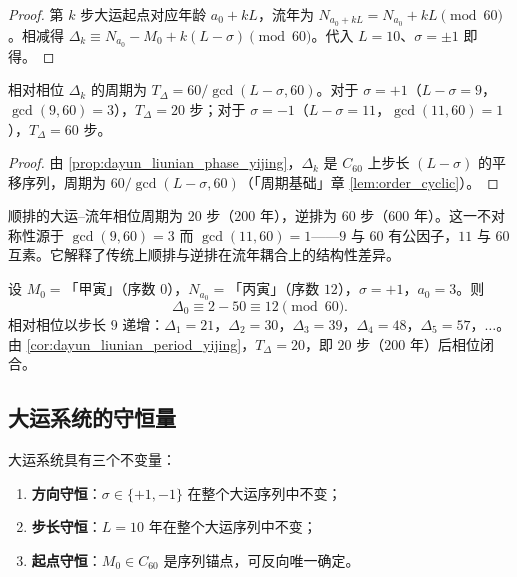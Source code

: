 \begin{proof}
第 $k$ 步大运起点对应年龄 $a_0+kL$，流年为 $N_{a_0+kL}=N_{a_0}+kL\pmod{60}$。相减得 $\Delta_k\equiv N_{a_0}-M_0+k(L-\sigma)\pmod{60}$。代入 $L=10$、$\sigma=\pm 1$ 即得。
\end{proof}

\begin{corollary}[大运--流年相对相位的周期]\label{cor:dayun_liunian_period_yijing}
相对相位 $\Delta_k$ 的周期为 $T_\Delta=60/\gcd(L-\sigma,60)$。对于 $\sigma=+1$（$L-\sigma=9$，$\gcd(9,60)=3$），$T_\Delta=20$ 步；对于 $\sigma=-1$（$L-\sigma=11$，$\gcd(11,60)=1$），$T_\Delta=60$ 步。
\end{corollary}

\begin{proof}
由 \cref{prop:dayun_liunian_phase_yijing}，$\Delta_k$ 是 $C_{60}$ 上步长 $(L-\sigma)$ 的平移序列，周期为 $60/\gcd(L-\sigma,60)$（「周期基础」章 \cref{lem:order_cyclic}）。
\end{proof}

\begin{remark}[顺排与逆排相位周期的不对称性]\label{rem:dayun_asymmetry_yijing}
顺排的大运--流年相位周期为 $20$ 步（$200$ 年），逆排为 $60$ 步（$600$ 年）。这一不对称性源于 $\gcd(9,60)=3$ 而 $\gcd(11,60)=1$——$9$ 与 $60$ 有公因子，$11$ 与 $60$ 互素。它解释了传统上顺排与逆排在流年耦合上的结构性差异。
\end{remark}

\begin{example}[大运--流年相位闭合的具体计算]\label{ex:dayun_liunian_closure_yijing}
设 $M_0=$「甲寅」（序数 $0$），$N_{a_0}=$「丙寅」（序数 $12$），$\sigma=+1$，$a_0=3$。则
\[
\Delta_0\equiv 2-50\equiv 12\pmod{60}.
\]
相对相位以步长 $9$ 递增：$\Delta_1=21$，$\Delta_2=30$，$\Delta_3=39$，$\Delta_4=48$，$\Delta_5=57$，$\dots$。由 \cref{cor:dayun_liunian_period_yijing}，$T_\Delta=20$，即 $20$ 步（$200$ 年）后相位闭合。
\end{example}

\subsection{大运系统的守恒量}

\begin{theorem}[大运系统的三个不变量]\label{thm:dayun_conservation_yijing}
大运系统具有三个不变量：
\begin{enumerate}[label=(\roman*)]
    \item \textbf{方向守恒}：$\sigma\in\{+1,-1\}$ 在整个大运序列中不变；
    \item \textbf{步长守恒}：$L=10$ 年在整个大运序列中不变；
    \item \textbf{起点守恒}：$M_0\in C_{60}$ 是序列锚点，可反向唯一确定。
\end{enumerate}
\end{theorem}


